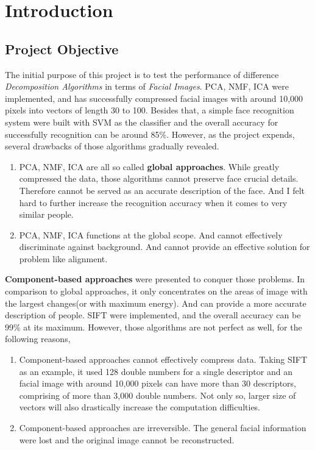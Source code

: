 \chapter{Introduction}

\section{Project Objective}
The initial purpose of this project is to test the performance of difference \textit{Decomposition Algorithms} in terms of \textit{Facial Images}. PCA, NMF, ICA were implemented, and has successfully compressed facial images with around 10,000 pixels into vectors of length 30 to 100. Besides that, a simple face recognition system were built with SVM as the classifier and the overall accuracy for successfully recognition can be around 85\%. However, as the project expends, several drawbacks of those algorithms gradually revealed. 
\begin{enumerate}
    \item PCA, NMF, ICA are all so called \textbf{global approaches}. While greatly compressed the data, those algorithms cannot preserve face crucial details. Therefore cannot be served as an accurate description of the face. And I felt hard to further increase the recognition accuracy when it comes to very similar people.
    \item PCA, NMF, ICA functions at the global scope. And cannot effectively discriminate against background. And cannot provide an effective solution for problem like alignment.
\end{enumerate}

\textbf{Component-based approaches} were presented to conquer those problems. In comparison to global 
approaches, it only concentrates on the areas of image with the largest changes(or with maximum energy). And can provide a more accurate description of people. SIFT were implemented, and the overall accuracy can be 99\% at its maximum. However, those algorithms are not perfect as well, for the following reasons,
\begin{enumerate}
    \item Component-based approaches cannot effectively compress data. Taking SIFT as an example, it used 128 double numbers for a single descriptor and an facial image with around 10,000 pixels can have more than 30 descriptors, comprising of more than 3,000 double numbers. Not only so, larger size of vectors will also drastically increase the computation difficulties.
    \item Component-based approaches are irreversible. The general facial information were lost and the original image cannot be reconstructed.
\end{enumerate}

